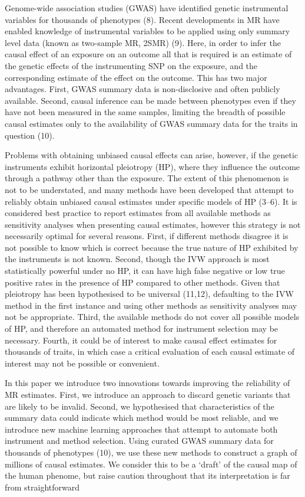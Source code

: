 \documentclass[]{article}
\begin{document}
Genome-wide association studies (GWAS) have identified genetic
instrumental variables for thousands of phenotypes (8). Recent
developments in MR have enabled knowledge of instrumental variables to
be applied using only summary level data (known as two-sample MR, 2SMR)
(9). Here, in order to infer the causal effect of an exposure on an
outcome all that is required is an estimate of the genetic effects of
the instrumenting SNP on the exposure, and the corresponding estimate of
the effect on the outcome. This has two major advantages. First, GWAS
summary data is non-disclosive and often publicly available. Second,
causal inference can be made between phenotypes even if they have not
been measured in the same samples, limiting the breadth of possible
causal estimates only to the availability of GWAS summary data for the
traits in question (10).

Problems with obtaining unbiased causal effects can arise, however, if
the genetic instruments exhibit horizontal pleiotropy (HP), where they
influence the outcome through a pathway other than the exposure. The
extent of this phenomenon is not to be understated, and many methods
have been developed that attempt to reliably obtain unbiased causal
estimates under specific models of HP (3--6). It is considered best
practice to report estimates from all available methods as sensitivity
analyses when presenting causal estimates, however this strategy is not
necessarily optimal for several reasons. First, if different methods
disagree it is not possible to know which is correct because the true
nature of HP exhibited by the instruments is not known. Second, though
the IVW approach is most statistically powerful under no HP, it can have
high false negative or low true positive rates in the presence of HP
compared to other methods. Given that pleiotropy has been hypothesised
to be universal (11,12), defaulting to the IVW method in the first
instance and using other methods as sensitivity analyses may not be
appropriate. Third, the available methods do not cover all possible
models of HP, and therefore an automated method for instrument selection
may be necessary. Fourth, it could be of interest to make causal effect
estimates for thousands of traits, in which case a critical evaluation
of each causal estimate of interest may not be possible or convenient.

In this paper we introduce two innovations towards improving the
reliability of MR estimates. First, we introduce an approach to discard
genetic variants that are likely to be invalid. Second, we hypothesised
that characteristics of the summary data could indicate which method
would be most reliable, and we introduce new machine learning approaches
that attempt to automate both instrument and method selection. Using
curated GWAS summary data for thousands of phenotypes (10), we use these
new methods to construct a graph of millions of causal estimates. We
consider this to be a `draft' of the causal map of the human phenome,
but raise caution throughout that its interpretation is far from
straightforward
\end{document}
